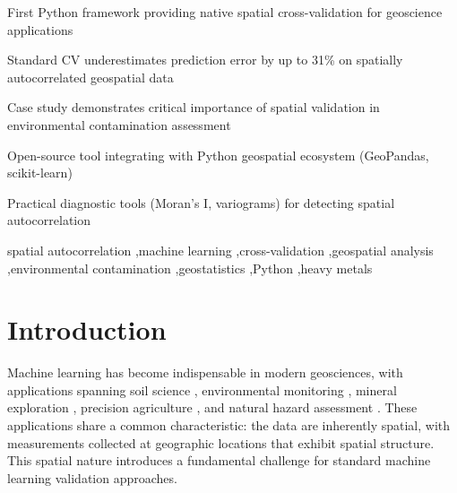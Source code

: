 \documentclass[a4paper,fleqn]{cas-sc}
\begin{document}
\begin{highlights}
\item First Python framework providing native spatial cross-validation for geoscience applications
\item Standard CV underestimates prediction error by up to 31\% on spatially autocorrelated geospatial data
\item Case study demonstrates critical importance of spatial validation in environmental contamination assessment
\item Open-source tool integrating with Python geospatial ecosystem (GeoPandas, scikit-learn)
\item Practical diagnostic tools (Moran's I, variograms) for detecting spatial autocorrelation
\end{highlights}

\begin{keywords}
spatial autocorrelation \sep machine learning \sep cross-validation \sep geospatial analysis \sep environmental contamination \sep geostatistics \sep Python \sep heavy metals
\end{keywords}

\maketitle

\printcredits

\doublespacing


\section{Introduction}
\label{sec:intro}

Machine learning has become indispensable in modern geosciences, with applications spanning soil science \citep{hengl2018random}, environmental monitoring \citep{rodriguez2018machine}, mineral exploration \citep{zuo2019machine}, precision agriculture \citep{liakos2018machine}, and natural hazard assessment \citep{reichenbach2018review}. These applications share a common characteristic: the data are inherently spatial, with measurements collected at geographic locations that exhibit spatial structure. This spatial nature introduces a fundamental challenge for standard machine learning validation approaches.
\end{document}
